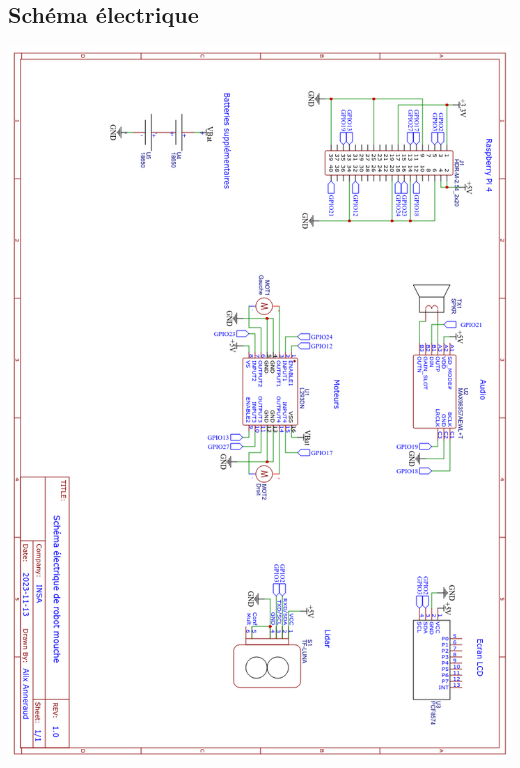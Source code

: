 \subsection{Schéma électrique}

\includegraphics[scale=0.5]{../images/Schema EasyEDA Robot-Mouche.png}